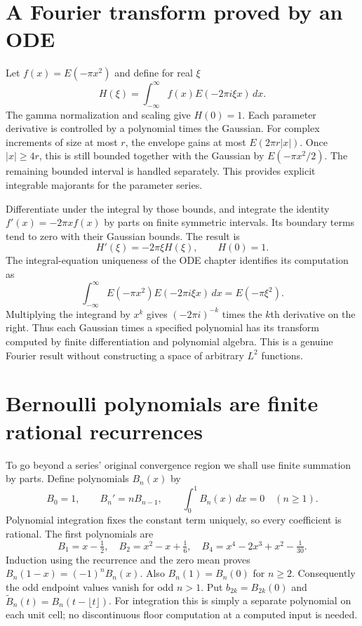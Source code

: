 \section{A Fourier transform proved by an ODE}
Let $f(x)=E(-\pi x^2)$ and define for real $\xi$
\[
 H(\xi)=\int_{-\infty}^\infty f(x)E(-2\pi i\xi x)\,dx.
\]
The gamma normalization and scaling give $H(0)=1$.  Each parameter
derivative is controlled by a polynomial times the Gaussian.  For complex
increments of size at most $r$, the envelope gains at most $E(2\pi r|x|)$.
Once $|x|\ge4r$, this is still bounded together with the Gaussian by
$E(-\pi x^2/2)$.  The remaining bounded interval is handled separately.
This provides explicit integrable majorants for the parameter series.

Differentiate under the integral by those bounds, and integrate the
identity $f'(x)=-2\pi xf(x)$ by parts on finite symmetric intervals.
Its boundary terms tend to zero with their Gaussian bounds.  The result is
\[
 H'(\xi)=-2\pi\xi H(\xi),\qquad H(0)=1.
\]
The integral-equation uniqueness of the ODE chapter identifies its
computation as
\[
 \boxed{\int_{-\infty}^\infty E(-\pi x^2)E(-2\pi i\xi x)\,dx
                         =E(-\pi\xi^2).}
\]
Multiplying the integrand by $x^k$ gives
$(-2\pi i)^{-k}$ times the $k$th derivative on the right.  Thus each
Gaussian times a specified polynomial has its transform computed by finite
differentiation and polynomial algebra.  This is a genuine Fourier result
without constructing a space of arbitrary $L^2$ functions.

\section{Bernoulli polynomials are finite rational recurrences}
To go beyond a series' original convergence region we shall use finite
summation by parts.  Define polynomials $B_n(x)$ by
\[
 B_0=1,\qquad B_n'=nB_{n-1},\qquad\int_0^1 B_n(x)\,dx=0\quad(n\ge1).
\]
Polynomial integration fixes the constant term uniquely, so every coefficient
is rational.  The first polynomials are
\[
 B_1=x-\tfrac12,\quad B_2=x^2-x+\tfrac16,
 \quad B_4=x^4-2x^3+x^2-\tfrac1{30}.
\]
Induction using the recurrence and the zero mean proves
$B_n(1-x)=(-1)^nB_n(x)$.  Also $B_n(1)=B_n(0)$ for $n\ge2$.
Consequently the odd endpoint values vanish for odd $n>1$.
Put $b_{2k}=B_{2k}(0)$ and $\widetilde B_n(t)=B_n(t-\lfloor t\rfloor)$.
For integration this is simply a separate polynomial on each unit cell;
no discontinuous floor computation at a computed input is needed.

